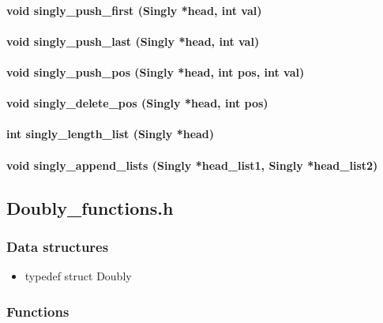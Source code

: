 {{\paragraph{void singly\_push\_first (Singly *head, int val)\\}
\paragraph{void singly\_push\_last (Singly *head, int val)\\}
\paragraph {void singly\_push\_pos (Singly *head, int pos, int val)\\}
\paragraph{void singly\_delete\_pos (Singly *head, int pos)\\}
\paragraph{int singly\_length\_list (Singly *head)\\}
\paragraph{void singly\_append\_lists (Singly *head\_list1, Singly *head\_list2)
\\}

\subsection{Doubly\_functions.h}
\subsubsection{Data structures}
\begin{itemize}
    \item typedef struct Doubly
\end{itemize}
\subsubsection{Functions}
}}
